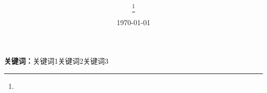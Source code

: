 \documentclass[UTF8,a4paper]{ctexart}
\title{\bfseries }
\author{ \thanks{ }} %
\date{\today}        %
\begin{document}
\maketitle


\begin{center}
\parbox{130mm}{
\par
\vspace{1mm}
{\bfseries 关键词：}关键词1\quad 关键词2\quad 关键词3}
\end{center}




\renewcommand{\refname}{参考文献}

\end{document}
